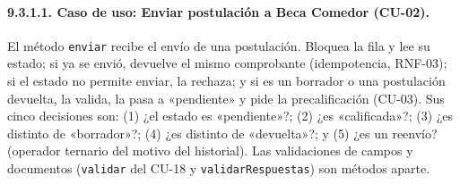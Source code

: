 \paragraph{9.3.1.1. Caso de uso: Enviar postulación a Beca Comedor (CU-02).}

El método \texttt{enviar} recibe el envío de una postulación. Bloquea la fila y lee su estado; si ya se envió, devuelve el mismo comprobante (idempotencia, RNF-03); si el estado no permite enviar, la rechaza; y si es un borrador o una postulación devuelta, la valida, la pasa a «pendiente» y pide la precalificación (CU-03). Sus cinco decisiones son: (1) ¿el estado es «pendiente»?; (2) ¿es «calificada»?; (3) ¿es distinto de «borrador»?; (4) ¿es distinto de «devuelta»?; y (5) ¿es un reenvío? (operador ternario del motivo del historial). Las validaciones de campos y documentos (\texttt{validar} del CU-18 y \texttt{validarRespuestas}) son métodos aparte.

